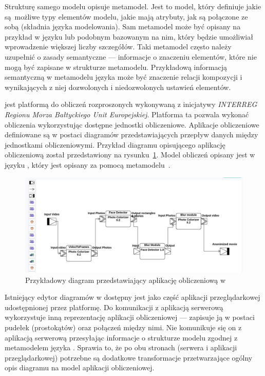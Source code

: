 Strukturę samego modelu opisuje metamodel. Jest to model, który definiuje jakie
są~możliwe typy elementów modelu, jakie mają atrybuty, jak są połączone ze
sobą (składnia języka modelowania). Sam metamodel może być opisany na przykład
w języku  lub podobnym
bazowanym na nim, który będzie umożliwiał wprowadzenie większej liczby
szczegółów. Taki metamodel często należy uzupełnić o zasady semantyczne ---
informacje o znaczeniu elementów, które nie mogą być zapisane w strukturze
metamodelu.
Przykładową informacją semantyczną w metamodelu języka  może być
znaczenie relacji kompozycji i wynikających z niej dozwolonych i niedozwolonych
ustawień elementów.

\BalticLSC{} jest platformą do obliczeń rozproszonych wykonywaną z
inicjatywy
\emph{INTERREG Regionu Morza Bałtyckiego Unit Europejskiej}. Platforma ta
pozwala
wykonać obliczenia wykorzystując dostępne jednostki obliczeniowe. Aplikacje
obliczeniowe definiowane są w postaci diagramów przedstawiających przepływ
danych między jednostkami obliczeniowymi. Przykład diagramu opisującego
aplikację
obliczeniową został przedstawiony na
rysunku~\ref{rys:przykladowy-diagram-balticlsc}.  Model obliczeń opisany jest w
języku , który jest opisany za pomocą
metamodelu~\cite{cal-metamodel}.

\begin{figure}[!ht]
	\centering

	\includegraphics[width=0.95\linewidth]{./images/balticlsc-example-diagram.png}
	\caption{Przykładowy diagram przedstawiający aplikację obliczeniową w
		\BalticLSC{}}\label{rys:przykladowy-diagram-balticlsc}
\end{figure}

Istniejący edytor diagramów w \BalticLSC{} dostępny jest jako część aplikacji
przeglądarkowej udostępnionej przez platformę. Do komunikacji z aplikacją
serwerową wykorzystuje inną reprezentację aplikacji obliczeniowej --- zapisuje
ją w postaci pudełek (prostokątów) oraz połączeń między nimi. Nie komunikuje
się on z aplikacją serwerową przesyłając informacje o strukturze modelu
zgodnej z metamodelem języka \CAL{}. Sprawia to, że po obu stronach (serwera
i aplikacji przeglądarkowej) potrzebne są dodatkowe transformacje
przetwarzające ogólny opis diagramu na model aplikacji obliczeniowej.

